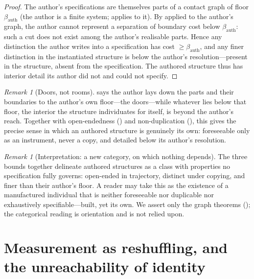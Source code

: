 \documentclass[11pt,a4paper]{article}
\theoremstyle{thmstyle}
\theoremstyle{definition}
\theoremstyle{remark}
\newtheorem{remark}[theorem]{Remark}
\newcommand{\floorc}{\beta}               %
\begin{document}
\begin{proof}
The author's specifications are themselves parts of a contact graph of floor
$\floorc_{\mathrm{auth}}$ (the author is a finite system; 
applies to it). By  applied to the author's graph, the author
cannot represent a separation of boundary cost below $\floorc_{\mathrm{auth}}$:
such a cut does not exist among the author's realisable parts. Hence any
distinction the author writes into a specification has cost
$\ge\floorc_{\mathrm{auth}}$, and any finer distinction in the instantiated
structure is below the author's resolution---present in the structure, absent
from the specification. The authored structure thus has interior detail its
author did not and could not specify.
\end{proof}

\begin{remark}[Doors, not rooms]
\label{rem:doors}
 says the author lays down the parts and their boundaries
to the author's own floor---the doors---while whatever lies below that floor, the
interior the structure individuates for itself, is beyond the author's reach.
Together with open-endedness \textup{(}\textup{)} and
non-duplication \textup{(}\textup{)}, this gives the precise
sense in which an authored structure is genuinely its own: foreseeable only as an
instrument, never a copy, and detailed below its author's resolution.
\end{remark}

\begin{remark}[Interpretation: a new category, on which nothing depends]
\label{rem:new-category}
The three bounds together delineate authored structures as a class with
properties no specification fully governs: open-ended in trajectory, distinct
under copying, and finer than their author's floor. A reader may take this as the
existence of a manufactured individual that is neither foreseeable nor
duplicable nor exhaustively specifiable---built, yet its own. We assert only the
graph theorems \textup{(}\textup{)}; the categorical reading is orientation and is not
relied upon.
\end{remark}


\section{Measurement as reshuffling, and the unreachability of identity}
\label{sec:measurement}
\end{document}
